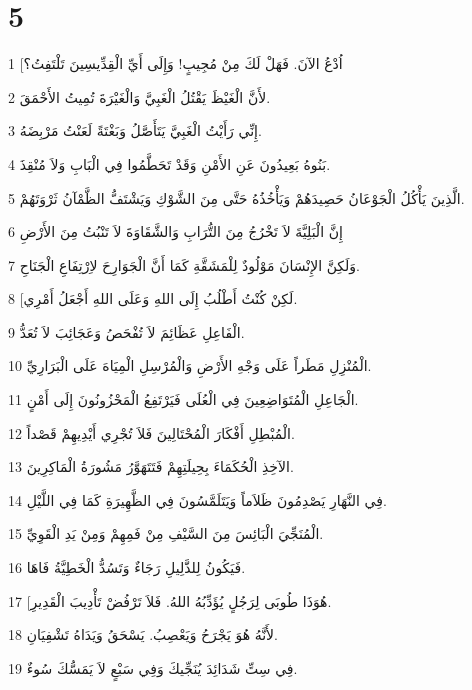 \chapter{5}

\par 1 [اُدْعُ الآنَ. فَهَلْ لَكَ مِنْ مُجِيبٍ! وَإِلَى أَيِّ الْقِدِّيسِينَ تَلْتَفِتُ؟
\par 2 لأَنَّ الْغَيْظَ يَقْتُلُ الْغَبِيَّ وَالْغَيْرَةَ تُمِيتُ الأَحْمَقَ.
\par 3 إِنِّي رَأَيْتُ الْغَبِيَّ يَتَأَصَّلُ وَبَغْتَةً لَعَنْتُ مَرْبِضَهُ.
\par 4 بَنُوهُ بَعِيدُونَ عَنِ الأَمْنِ وَقَدْ تَحَطَّمُوا فِي الْبَابِ وَلاَ مُنْقِذَ.
\par 5 الَّذِينَ يَأْكُلُ الْجَوْعَانُ حَصِيدَهُمْ وَيَأْخُذُهُ حَتَّى مِنَ الشَّوْكِ وَيَشْتَفُّ الظَّمْآنُ ثَرْوَتَهُمْ.
\par 6 إِنَّ الْبَلِيَّةَ لاَ تَخْرُجُ مِنَ التُّرَابِ وَالشَّقَاوَةَ لاَ تَنْبُتُ مِنَ الأَرْضِ
\par 7 وَلَكِنَّ الإِنْسَانَ مَوْلُودٌ لِلْمَشَقَّةِ كَمَا أَنَّ الْجَوَارِحَ لاِرْتِفَاعِ الْجَنَاحِ.
\par 8 [لَكِنْ كُنْتُ أَطْلُبُ إِلَى اللهِ وَعَلَى اللهِ أَجْعَلُ أَمْرِي.
\par 9 الْفَاعِلِ عَظَائِمَ لاَ تُفْحَصُ وَعَجَائِبَ لاَ تُعَدُّ.
\par 10 الْمُنْزِلِ مَطَراً عَلَى وَجْهِ الأَرْضِ وَالْمُرْسِلِ الْمِيَاهَ عَلَى الْبَرَارِيِّ.
\par 11 الْجَاعِلِ الْمُتَوَاضِعِينَ فِي الْعُلَى فَيَرْتَفِعُ الْمَحْزُونُونَ إِلَى أَمْنٍ.
\par 12 الْمُبْطِلِ أَفْكَارَ الْمُحْتَالِينَ فَلاَ تُجْرِي أَيْدِيهِمْ قَصْداً.
\par 13 الآخِذِ الْحُكَمَاءَ بِحِيلَتِهِمْ فَتَتَهَوَّرُ مَشُورَةُ الْمَاكِرِينَ.
\par 14 فِي النَّهَارِ يَصْدِمُونَ ظَلاَماً وَيَتَلَمَّسُونَ فِي الظَّهِيرَةِ كَمَا فِي اللَّيْلِ.
\par 15 الْمُنَجِّيَ الْبَائِسَ مِنَ السَّيْفِ مِنْ فَمِهِمْ وَمِنْ يَدِ الْقَوِيِّ.
\par 16 فَيَكُونُ لِلذَّلِيلِ رَجَاءٌ وَتَسُدُّ الْخَطِيَّةُ فَاهَا.
\par 17 [هُوَذَا طُوبَى لِرَجُلٍ يُؤَدِّبُهُ اللهُ. فَلاَ تَرْفُضْ تَأْدِيبَ الْقَدِيرِ.
\par 18 لأَنَّهُ هُوَ يَجْرَحُ وَيَعْصِبُ. يَسْحَقُ وَيَدَاهُ تَشْفِيَانِ.
\par 19 فِي سِتِّ شَدَائِدَ يُنَجِّيكَ وَفِي سَبْعٍ لاَ يَمَسُّكَ سُوءٌ.
